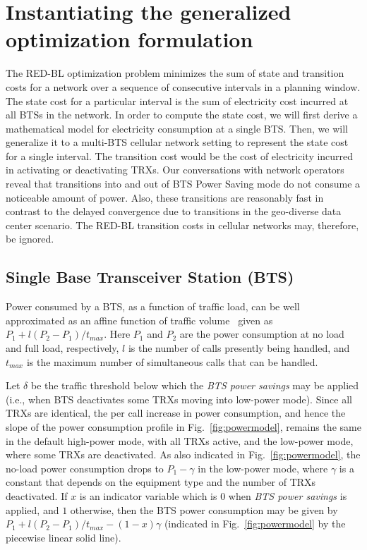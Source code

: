 \section{Instantiating the generalized optimization formulation} %
\label{sec:case2:instantiate}
The RED-BL optimization problem minimizes the sum of state and transition costs for a network over a sequence of consecutive intervals in a planning window. The state cost for a particular interval is the sum of electricity cost incurred at all BTSs in the network. In order to compute the state cost, we will first derive a mathematical model for electricity consumption at a single BTS. Then, we will generalize it to a multi-BTS cellular network setting to represent the state cost for a single interval. The transition cost would be the cost of electricity incurred in activating or deactivating TRXs. Our conversations with network operators reveal that transitions into and out of BTS Power Saving mode do not consume a noticeable amount of power. Also, these transitions are reasonably fast in contrast to the delayed convergence due to transitions in the geo-diverse data center scenario. The RED-BL transition costs in cellular networks may, therefore, be ignored.

\subsection{Single Base Transceiver Station (BTS)}
\label{sec:case2:instantiate:single-cell}
Power consumed by a BTS, as a function of traffic load, can be
well approximated as an affine function  of traffic volume~\cite{Peng:2011:BTSSaving:Mobicom} given as
$P_1+l(P_2-P_1)/t_{max}$. Here $P_1$ and $P_2$ are the power
consumption at no load and full load, respectively, $l$ is the
number of calls presently being handled, and $t_{max}$ is the
maximum number of simultaneous calls that can be handled.

Let $\delta$ be the traffic threshold below which the \textit{BTS power savings} may be applied (i.e., when BTS deactivates some TRXs moving into low-power mode). Since all TRXs are identical, the per call increase in power consumption, and hence the slope of the power consumption profile in Fig.~\ref{fig:powermodel}, remains the same in the default high-power mode, with all TRXs active, and the low-power mode, where some TRXs are deactivated. As also indicated in Fig.~\ref{fig:powermodel}, the no-load power consumption drops to $P_1-\gamma$ in the low-power mode, where $\gamma$ is a constant that depends on the equipment type and the number of TRXs deactivated. If $x$ is an indicator variable which is $0$ when \textit{BTS power savings} is applied, and $1$ otherwise, then the BTS power consumption may be given by $P_1+l(P_2-P_1)/t_{max} - (1-x)\gamma$ (indicated in Fig.~\ref{fig:powermodel} by the piecewise linear solid line).

